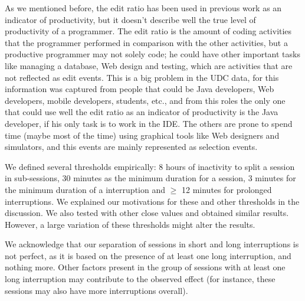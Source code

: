 \documentclass[times]{smrauth}
\newcommand\RR[1]{\textbf{Romain #1}}
\begin{document}
As we mentioned before, the edit ratio has been used in previous work as an indicator of productivity, but it doesn't describe well the true level of productivity of a programmer. The edit ratio is the amount of coding activities that the programmer performed in comparison with the other activities, but a productive programmer may not solely code; he could have other important tasks like managing a database, Web design and testing, which are activities that are not reflected as edit events. This is a big problem in the UDC data, for this information was captured from people that could be Java developers, Web developers, mobile developers, students, etc., and from this roles the only one that could use well the edit ratio as an indicator of productivity is the Java developer, if his only task is to work in the IDE. The others are prone to spend time (maybe most of the time) using graphical tools like Web designers and simulators, and this events are mainly represented as selection events.

We defined several thresholds empirically: 8 hours of inactivity to split a session in sub-sessions, 30 minutes as the minimum duration for a session, 3 minutes for the minimum duration of a interruption and  $\geq$ 12 minutes for prolonged interruptions. We explained our motivations for these and other thresholds in the discussion. We also tested with other close values and obtained similar results. However, a large variation of these thresholds might alter the results. 

We acknowledge that our separation of sessions in short and long interruptions is not perfect, as it is based on the presence of at least one long interruption, and nothing more. Other factors present in the group of sessions with at least one long interruption may contribute to the observed effect (for instance, these sessions may also have more interruptions overall).


\end{document}
